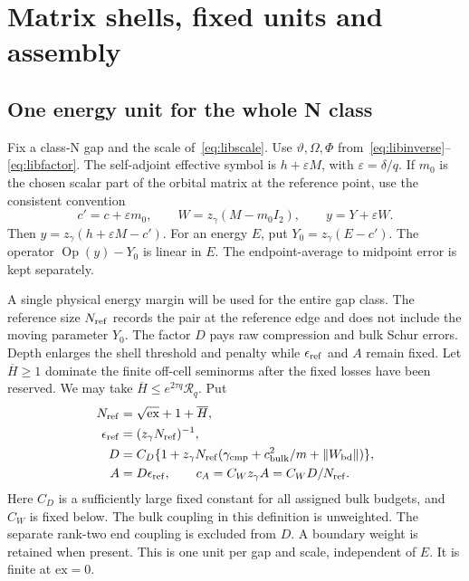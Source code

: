 \section{Matrix shells, fixed units and assembly}\label{sec:matrixshells}

\subsection{One energy unit for the whole N class}

Fix a class-N gap and the scale of~\eqref{eq:libscale}.
Use $\vartheta,\Omega,\Phi$ from~\eqref{eq:libinverse}--\eqref{eq:libfactor}.
The self-adjoint effective symbol is $h+\varepsilon M$, with
$\varepsilon=\delta/q$. If $m_0$ is the chosen scalar part of the
orbital matrix at the reference point, use the consistent convention
\begin{equation}\label{eq:libcenter}
 c'=c+\varepsilon m_0,\qquad
 W=z_\gamma(M-m_0I_2),\qquad y=Y+\varepsilon W.
\end{equation}
Then $y=z_\gamma(h+\varepsilon M-c')$.
For an energy $E$, put $Y_0=z_\gamma(E-c')$.
The operator $\operatorname{Op}(y)-Y_0$ is linear in $E$.
The endpoint-average to midpoint error is kept separately.

A single physical energy margin will be used for the entire gap class.
The reference size $N_{\rm ref}$ records the pair at the reference edge
and does not include the moving parameter $Y_0$. The factor $D$ pays
raw compression and bulk Schur errors. Depth enlarges the shell
threshold and penalty while $\epsilon_{\rm ref}$ and $A$ remain fixed.
Let $\overline H\ge1$ dominate the finite off-cell seminorms after
the fixed losses have been reserved. We may take
$\overline H\le e^{2\tau q}\mathcal R_q$.
Put
\begin{equation}\label{eq:libunit}
 \begin{split}
 N_{\rm ref}&=\sqrt{\mathrm{ex}}+1+\overline H,\\
 \epsilon_{\rm ref}&=(z_\gamma N_{\rm ref})^{-1},\\
 D&=C_D\{1+z_\gamma N_{\rm ref}
       (\gamma_{\rm cmp}+c_{\rm bulk}^2/m+\|W_{\rm bd}\|)\},\\
 A&=D\epsilon_{\rm ref},\qquad c_A=C_Wz_\gamma A=C_WD/N_{\rm ref}.
 \end{split}
\end{equation}
Here $C_D$ is a sufficiently large fixed constant for all assigned
bulk budgets, and $C_W$ is fixed below. The bulk coupling in this
definition is unweighted. The separate rank-two end coupling is
excluded from $D$. A boundary weight is retained when present.
This is one unit per gap and scale, independent of $E$.
It is finite at $\mathrm{ex}=0$.

